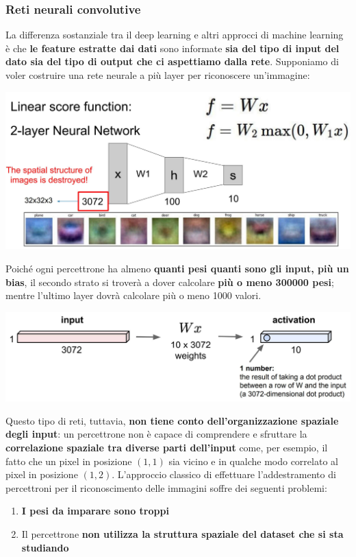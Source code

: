 \documentclass[12pt]{article}
\begin{document}
\subsubsection{Reti neurali convolutive}
La differenza sostanziale tra il deep learning e altri approcci di machine learning è che \textbf{le feature estratte dai dati} sono informate \textbf{sia del tipo di input del dato sia del tipo di output che ci aspettiamo dalla rete}.
Supponiamo di voler costruire una rete neurale a più layer per riconoscere un'immagine:
\begin{center}
    \includegraphics[width =0.90\linewidth]{Images/143.PNG}
\end{center}
Poiché ogni percettrone ha almeno \textbf{quanti pesi quanti sono gli input, più un bias}, il secondo strato si troverà a dover calcolare \textbf{più o meno 300000 pesi}; mentre l'ultimo layer dovrà calcolare più o meno 1000 valori.
\begin{center}
    \includegraphics[width =0.90\linewidth]{Images/144.PNG}
\end{center}
Questo tipo di reti, tuttavia, \textbf{non tiene conto dell'organizzazione spaziale degli input}: un percettrone non è capace di comprendere e sfruttare la \textbf{correlazione spaziale tra diverse parti dell'input} come, per esempio, il fatto che un pixel in posizione $(1,1)$ sia vicino e in qualche modo correlato al pixel in posizione $(1,2)$.
L'approccio classico di effettuare l'addestramento di percettroni per il riconoscimento delle immagini soffre dei seguenti problemi:
\begin{enumerate}
    \item \textbf{I pesi da imparare sono troppi}
    \item Il percettrone \textbf{non utilizza la struttura spaziale del dataset che si sta studiando}
\end{enumerate}
\end{document}
